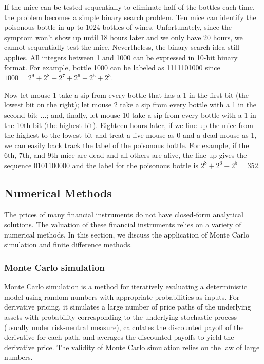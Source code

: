 \begin{solution}
If the mice can be tested sequentially to eliminate half of the bottles each time, the
problem becomes a simple binary search problem. Ten mice can identify the poisonous
bottle in up to 1024 bottles of wines. Unfortunately, since the symptom won't show up
until 18 hours later and we only have 20 hours, we cannot sequentially test the mice.
Nevertheless, the binary search idea still applies. All integers between 1 and 1000
can be expressed in 10-bit binary format. For example, bottle 1000 can be labeled as
1111101000 since $1000=2^9+2^8+2^7+2^6+2^5+2^3$.

Now let mouse 1 take a sip from every bottle that has a 1 in the first bit (the lowest bit
on the right); let mouse 2 take a sip from every bottle with a 1 in the second bit; $\ldots$;
and, finally, let mouse 10 take a sip from every bottle with a 1 in the 10th bit (the highest
bit). Eighteen hours later, if we line up the mice from the highest to the lowest bit and
treat a live mouse as 0 and a dead mouse as 1, we can easily back track the label of the
poisonous bottle. For example, if the 6th, 7th, and 9th mice are dead and all others are
alive, the line-up gives the sequence 0101100000 and the label for the poisonous bottle
is $2^8+2^6+2^5=352$.

\end{solution}


\subsection{Numerical Methods}
\enlargethispage{1pt}

The prices of many financial instruments do not have closed-form analytical solutions.
The valuation of these financial instruments relies on a variety of numerical methods. In
this section, we discuss the application of Monte Carlo simulation and finite difference
methods.

\subsubsection*{Monte Carlo simulation}

Monte Carlo simulation is a method for iteratively evaluating a deterministic model using
random numbers with appropriate probabilities as inputs. For derivative pricing, it
simulates a large number of price paths of the underlying assets with probability
corresponding to the underlying stochastic process (usually under risk-neutral measure),
calculates the discounted payoff of the derivative for each path, and averages the
discounted payoffs to yield the derivative price. The validity of Monte Carlo simulation
relies on the law of large numbers.

